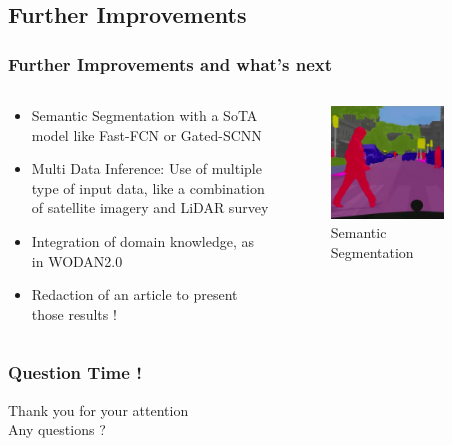 \documentclass[aspectratio=169]{beamer}
\begin{document}
\subsection{Further Improvements}
\begin{frame}
	\frametitle{Further Improvements and what's next}
	\begin{columns}[] %
		\begin{column}{.48\textwidth}
	\begin{itemize}
		\item Semantic Segmentation with a SoTA model like Fast-FCN or Gated-SCNN
		\item Multi Data Inference: Use of multiple type of input data, like a combination of satellite imagery and LiDAR survey 
		\item Integration of domain knowledge, as in WODAN2.0\cite{verschoofAl2020} 
		\item Redaction of an article to present those results ! 
	\end{itemize}
	\end{column}
			\hfill
		\begin{column}{.48\textwidth}
		\begin{figure}
		  \includegraphics[width=0.8\textwidth]{semseg}
			\caption{Semantic Segmentation}
		\end{figure}
	\end{column}
	\end{columns}

\end{frame}

\begin{frame}
	\frametitle{Question Time !}
	\centering
	\Huge{Thank you for your attention\\
	Any questions ?}
\end{frame}

\begin{frame}[allowframebreaks]
	\printbibliography[heading=bibintoc]
\end{frame}
\end{document}
